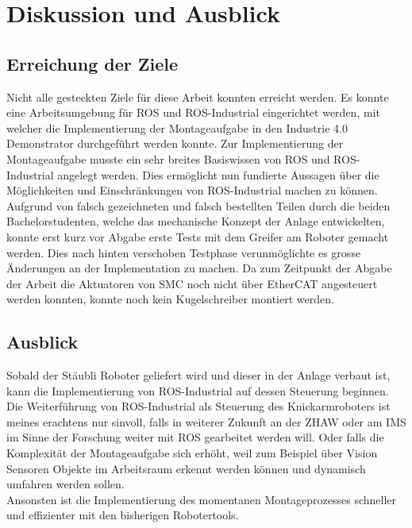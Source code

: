 \chapter{Diskussion und Ausblick}
\label{sec:DiskussionUndAusblick}

\section{Erreichung der Ziele}
Nicht alle gesteckten Ziele für diese Arbeit konnten erreicht werden. Es konnte eine Arbeitsumgebung für ROS und ROS-Industrial eingerichtet werden, mit welcher die Implementierung der Montageaufgabe in den Industrie 4.0 Demonstrator durchgeführt werden konnte. Zur Implementierung der Montageaufgabe musste ein sehr breites Basiswissen von ROS und ROS-Industrial angelegt werden. Dies ermöglicht nun fundierte Aussagen über die Möglichkeiten und Einschränkungen von ROS-Industrial machen zu können.\\

Aufgrund von falsch gezeichneten und falsch bestellten Teilen durch die beiden Bachelorstudenten, welche das mechanische Konzept der Anlage entwickelten, konnte erst kurz vor Abgabe erste Tests mit dem Greifer am Roboter gemacht werden. Dies nach hinten verschoben Testphase verunmöglichte es grosse Änderungen an der Implementation zu machen. Da zum Zeitpunkt der Abgabe der Arbeit die Aktuatoren von SMC noch nicht über EtherCAT angesteuert werden konnten, konnte noch kein Kugelschreiber montiert werden.

\section{Ausblick}
Sobald der Stäubli Roboter geliefert wird und dieser in der Anlage verbaut ist, kann die Implementierung von ROS-Industrial auf dessen Steuerung beginnen. Die Weiterführung von ROS-Industrial als Steuerung des Knickarmroboters ist meines erachtens nur sinvoll, falls in weiterer Zukunft an der ZHAW oder am IMS im Sinne der Forschung weiter mit ROS gearbeitet werden will. Oder falls die Komplexität der Montageaufgabe sich erhöht, weil zum Beispiel über Vision Sensoren Objekte im Arbeitsraum erkennt werden können und dynamisch umfahren werden sollen. \\
Ansonsten ist die Implementierung des momentanen Montageprozesses schneller und effizienter mit den bisherigen Robotertools.
